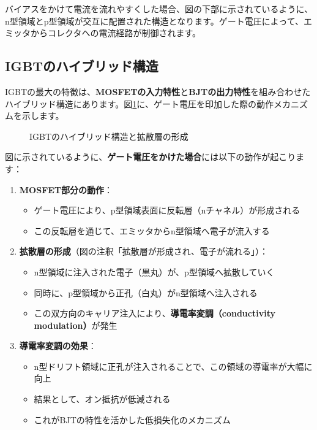バイアスをかけて電流を流れやすくした場合、図の下部に示されているように、n型領域とp型領域が交互に配置された構造となります。ゲート電圧によって、エミッタからコレクタへの電流経路が制御されます。

\subsection{IGBTのハイブリッド構造}

IGBTの最大の特徴は、\textbf{MOSFETの入力特性}と\textbf{BJTの出力特性}を組み合わせたハイブリッド構造にあります。図\ref{fig:igbt_hybrid}に、ゲート電圧を印加した際の動作メカニズムを示します。

\begin{figure}[H]
\centering
{}
\caption{IGBTのハイブリッド構造と拡散層の形成}
\label{fig:igbt_hybrid}
\end{figure}

図に示されているように、\textbf{ゲート電圧をかけた場合}には以下の動作が起こります：

\begin{enumerate}
\item \textbf{MOSFET部分の動作}：
\begin{itemize}
\item ゲート電圧により、p型領域表面に反転層（nチャネル）が形成される
\item この反転層を通じて、エミッタからn型領域へ電子が流入する
\end{itemize}

\item \textbf{拡散層の形成}（図の注釈「拡散層が形成され、電子が流れる」）：
\begin{itemize}
\item n型領域に注入された電子（黒丸）が、p型領域へ拡散していく
\item 同時に、p型領域から正孔（白丸）がn型領域へ注入される
\item この双方向のキャリア注入により、\textbf{導電率変調（conductivity modulation）}が発生
\end{itemize}

\item \textbf{導電率変調の効果}：
\begin{itemize}
\item n型ドリフト領域に正孔が注入されることで、この領域の導電率が大幅に向上
\item 結果として、オン抵抗が低減される
\item これがBJTの特性を活かした低損失化のメカニズム
\end{itemize}
\end{enumerate}

